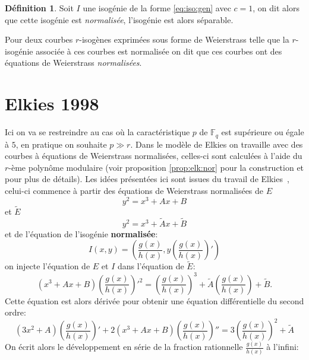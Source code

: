 \documentclass[10pt,a4paper]{book}
\theoremstyle{plain}
\theoremstyle{definition}
\theoremstyle{definition}
\theoremstyle{definition}
\theoremstyle{definition}
\newtheorem{defi}[thm]{Définition}
\theoremstyle{remark}
\theoremstyle{remark}
\theoremstyle{definition}
\begin{document}
\begin{defi}
Soit $I$ une isogénie de la forme \eqref{eq:iso:gen} avec $c=1$, on dit alors 
que cette isogénie est \emph{normalisée}, l'isogénie est alors séparable. 

Pour deux courbes $r$-isogènes exprimées sous forme de Weierstrass telle que
la $r$-isogénie associée à ces courbes est normalisée on dit que ces 
courbes ont des équations de Weierstrass \emph{normalisées}. 
\end{defi}

\section{Elkies 1998}
Ici on va se restreindre au cas où la caractéristique $p$ de $\mathbb{F}_q$ est supérieure ou égale à $5$, en pratique on souhaite $p \gg r$.
Dans le modèle de Elkies on travaille avec des courbes à équations de Weierstrass normalisées, celles-ci sont calculées à l'aide du $r$-ème polynôme modulaire (voir proposition \ref{prop:elk:nor} pour la construction et \cite{Schoof95} pour plus de détails).
Les idées présentées ici sont issues du travail de Elkies~\cite[§The kernel of
 the isogeny]{elkies1998}, celui-ci commence à partir des équations de 
 Weierstrass normalisées de $E$
\begin{equation}
y^2=x^3+Ax+B
\end{equation}
 et $\tilde{E}$
\begin{equation}
y^2=x^3+\tilde{A}x+\tilde{B}
\end{equation}
et de l'équation de l'isogénie \textbf{normalisée}:
\begin{equation} 
I(x,y)=\left(\frac{g(x)}{h(x)},y\left( \frac{g(x)}{h(x)} \right)'\right) 
\end{equation}
on injecte l'équation de $E$ et $I$ dans l'équation de $\tilde{E}$:
\begin{equation}
(x^3+Ax+B)\left(\frac{g(x)}{h(x)} \right)'^2=  \left(\frac{g(x)}{h(x)} \right)^3 + \tilde{A} \left(\frac{g(x)}{h(x)} \right) + \tilde{B}.
\end{equation}
Cette équation est alors dérivée pour obtenir une équation différentielle du second ordre:
\begin{equation}
\label{eq:Elkies-deriv}
(3x^2+A)\left(\frac{g(x)}{h(x)} \right)'+2(x^3+Ax+B)\left(\frac{g(x)}{h(x)} \right)''=  3\left(\frac{g(x)}{h(x)} \right)^2 + \tilde{A}
\end{equation}
On écrit alors le développement en série de la fraction rationnelle $\frac{g(x)}{h(x)}$ à l'infini:
\end{document}
